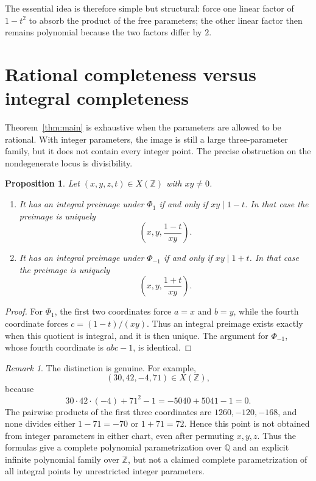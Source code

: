 \documentclass[11pt]{article}
\newtheorem{proposition}[theorem]{Proposition}
\theoremstyle{remark}
\newtheorem{remark}[theorem]{Remark}
\newcommand{\Z}{\mathbb Z}
\newcommand{\Q}{\mathbb Q}
\begin{document}
The essential idea is therefore simple but structural: force one linear
factor of \(1-t^2\) to absorb the product of the free parameters; the other
linear factor then remains polynomial because the two factors differ by
\(2\).

\section{Rational completeness versus integral completeness}

Theorem~\ref{thm:main} is exhaustive when the parameters are allowed to be
rational.  With integer parameters, the image is still a large
three-parameter family, but it does not contain every integer point.  The
precise obstruction on the nondegenerate locus is divisibility.

\begin{proposition}\label{prop:integrality}
Let \((x,y,z,t)\in X(\Z)\) with \(xy\ne0\).
\begin{enumerate}
    \item It has an integral preimage under \(\Phi_1\) if and only if
    \(xy\mid 1-t\).  In that case the preimage is uniquely
    \[
       \left(x,y,\frac{1-t}{xy}\right).
    \]

    \item It has an integral preimage under \(\Phi_{-1}\) if and only if
    \(xy\mid 1+t\).  In that case the preimage is uniquely
    \[
       \left(x,y,\frac{1+t}{xy}\right).
    \]
\end{enumerate}
\end{proposition}

\begin{proof}
For \(\Phi_1\), the first two coordinates force \(a=x\) and \(b=y\), while
the fourth coordinate forces
\(c=(1-t)/(xy)\).  Thus an integral preimage exists exactly when this
quotient is integral, and it is then unique.  The argument for
\(\Phi_{-1}\), whose fourth coordinate is \(abc-1\), is identical.
\end{proof}

\begin{remark}\label{rem:scope}
The distinction is genuine.  For example,
\[
(30,42,-4,71)\in X(\Z),
\]
because
\[
30\cdot42\cdot(-4)+71^2-1=-5040+5041-1=0.
\]
The pairwise products of the first three coordinates are
\(1260,-120,-168\), and none divides either
\(1-71=-70\) or \(1+71=72\).  Hence this point is not obtained from
integer parameters in either chart, even after permuting \(x,y,z\).
Thus the formulas give a complete polynomial parametrization over \(\Q\)
and an explicit infinite polynomial family over \(\Z\), but not a claimed
complete parametrization of all integral points by unrestricted integer
parameters.
\end{remark}
\end{document}

